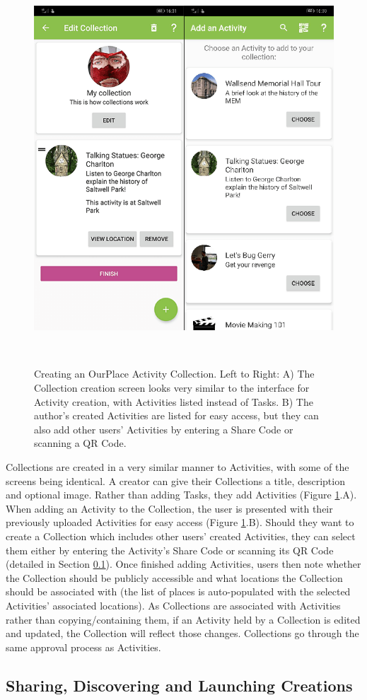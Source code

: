 \begin{figure}
  \centering
  \includegraphics[width=0.5\columnwidth]{images/chapter05/CreateCollection.png}
  \caption[Creating an OurPlace Activity Collection]{Creating an OurPlace Activity Collection. Left to Right: A) The Collection creation screen looks very similar to the interface for Activity creation, with Activities listed instead of Tasks. B) The author's created Activities are listed for easy access, but they can also add other users' Activities by entering a Share Code or scanning a QR Code. }~\label{fig:CollectionCreation}
\end{figure}

Collections are created in a very similar manner to Activities, with some of the screens being identical. A creator can give their Collections a title, description and optional image. Rather than adding Tasks, they add Activities (Figure \ref{fig:CollectionCreation}.A). When adding an Activity to the Collection, the user is presented with their previously uploaded Activities for easy access (Figure \ref{fig:CollectionCreation}.B). Should they want to create a Collection which includes other users' created Activities, they can select them either by entering the Activity's Share Code or scanning its QR Code (detailed in Section \ref{sec:SharingActivities}). Once finished adding Activities, users then note whether the Collection should be publicly accessible and what locations the Collection should be associated with (the list of places is auto-populated with the selected Activities' associated locations). As Collections are associated with Activities rather than copying/containing them, if an Activity held by a Collection is edited and updated, the Collection will reflect those changes. Collections go through the same approval process as Activities.

\subsection{Sharing, Discovering and Launching Creations}
\label{sec:SharingActivities}

